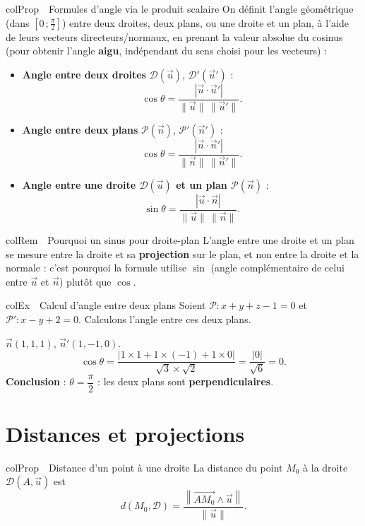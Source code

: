 \documentclass[11pt,a4paper]{article}
\newenvironment{propriete}[1][Propriété]
  {\begin{fiche}{colProp}{\ding{72}~~#1}}{\end{fiche}}
\newenvironment{exemple}[1][Exemple]
  {\begin{fiche}{colEx}{\ding{217}~~#1}}{\end{fiche}}
\newenvironment{remarque}[1][Remarque]
  {\begin{fiche}{colRem}{\ding{43}~~#1}}{\end{fiche}}
\begin{document}
\begin{propriete}[Formules d'angle via le produit scalaire]
On définit l'angle géométrique (dans $\left[0\,;\frac\pi2\right]$) entre deux droites, deux plans, ou une droite et un plan, à l'aide de leurs vecteurs directeurs/normaux, en prenant la valeur absolue du cosinus (pour obtenir l'angle \textbf{aigu}, indépendant du sens choisi pour les vecteurs) :
\begin{itemize}[leftmargin=6mm, itemsep=0.5mm]
  \item \textbf{Angle entre deux droites} $\mathcal{D}(\vec u)$, $\mathcal{D}'(\vec u')$ :
  \[
    \cos\theta = \frac{|\vec u\cdot\vec u'|}{\|\vec u\|\,\|\vec u'\|}.
  \]
  \item \textbf{Angle entre deux plans} $\mathcal{P}(\vec n)$, $\mathcal{P}'(\vec n')$ :
  \[
    \cos\theta = \frac{|\vec n\cdot\vec n'|}{\|\vec n\|\,\|\vec n'\|}.
  \]
  \item \textbf{Angle entre une droite $\mathcal{D}(\vec u)$ et un plan $\mathcal{P}(\vec n)$} :
  \[
    \sin\theta = \frac{|\vec u\cdot\vec n|}{\|\vec u\|\,\|\vec n\|}.
  \]
\end{itemize}
\end{propriete}

\begin{remarque}[Pourquoi un sinus pour droite-plan]
L'angle entre une droite et un plan se mesure entre la droite et sa \textbf{projection} sur le plan, et non entre la droite et la normale : c'est pourquoi la formule utilise $\sin$ (angle complémentaire de celui entre $\vec u$ et $\vec n$) plutôt que $\cos$.
\end{remarque}

\begin{exemple}[Calcul d'angle entre deux plans]
Soient $\mathcal{P}:x+y+z-1=0$ et $\mathcal{P}':x-y+2=0$. Calculons l'angle entre ces deux plans.

\smallskip
$\vec n(1,1,1)$, $\vec n'(1,-1,0)$.
\[
  \cos\theta = \frac{|1\times1+1\times(-1)+1\times0|}{\sqrt3\times\sqrt2} = \frac{|0|}{\sqrt6} = 0.
\]
\textbf{Conclusion} : $\theta=\dfrac\pi2$ : les deux plans sont \textbf{perpendiculaires}.
\end{exemple}

\section{Distances et projections}

\begin{propriete}[Distance d'un point à une droite]
La distance du point $M_0$ à la droite $\mathcal{D}(A,\vec u)$ est
\[
  d(M_0,\mathcal{D}) = \frac{\left\|\overrightarrow{AM_0}\wedge\vec u\right\|}{\|\vec u\|}.
\]
\end{propriete}
\end{document}
